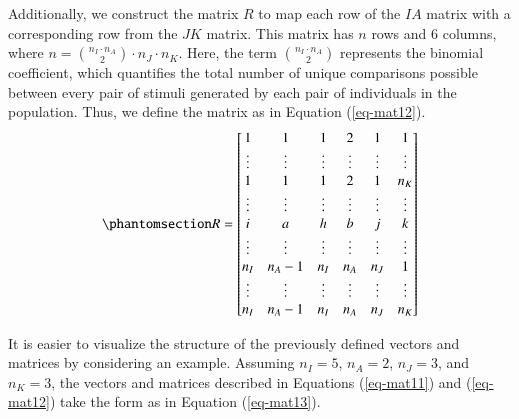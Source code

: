 \documentclass[
  authoryear,
  review,
  1p]{elsarticle}
\begin{document}
Additionally, we construct the matrix \(R\) to map each row of the
\(IA\) matrix with a corresponding row from the \(JK\) matrix. This
matrix has \(n\) rows and \(6\) columns, where
\(n = {n_{I} \cdot n_{A} \choose 2} \cdot n_{J} \cdot n_{K}\). Here, the
term \({n_{I} \cdot n_{A} \choose 2}\) represents the binomial
coefficient, which quantifies the total number of unique comparisons
possible between every pair of stimuli generated by each pair of
individuals in the population. Thus, we define the matrix as in Equation
(\ref{eq-mat12}). \begin{equation}\phantomsection\label{eq-mat12}{
R = \begin{bmatrix}
1 & 1 & 1 & 2 & 1 & 1 \\
\vdots & \vdots & \vdots & \vdots & \vdots & \vdots\\
1 & 1 & 1 & 2 & 1 & n_{K} \\
\vdots & \vdots & \vdots & \vdots & \vdots & \vdots\\
i & a & h & b & j & k \\
\vdots & \vdots & \vdots & \vdots & \vdots & \vdots\\
n_{I} & n_{A}-1 & n_{I} & n_{A} & n_{J} & 1 \\
\vdots & \vdots & \vdots & \vdots & \vdots & \vdots\\
n_{I} & n_{A}-1 & n_{I} & n_{A} & n_{J} & n_{K}
\end{bmatrix}
}\end{equation}

It is easier to visualize the structure of the previously defined
vectors and matrices by considering an example. Assuming \(n_{I} = 5\),
\(n_{A} = 2\), \(n_{J} = 3\), and \(n_{K} = 3\), the vectors and
matrices described in Equations (\ref{eq-mat11}) and (\ref{eq-mat12})
take the form as in Equation (\ref{eq-mat13}).
\end{document}
